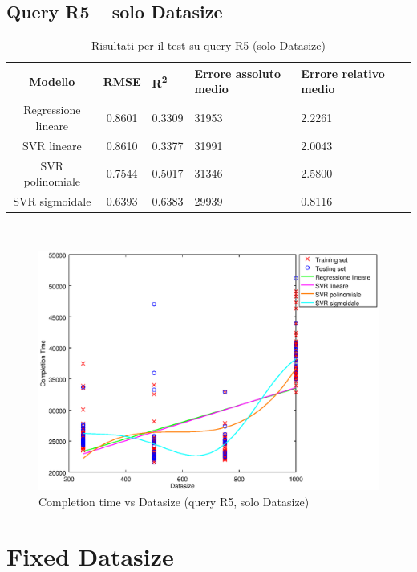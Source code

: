 \documentclass[a4paper,11pt]{article}
\begin{document}
\subsection{Query R5 -- solo Datasize}
\begin{table}[bhpt]
	\centering
	\begin{adjustbox}{center}
		\begin{tabular}{c | c M{1cm} M{2.5cm} M{2.5cm} M{1.8cm}}
			Modello & RMSE & R\textsuperscript{2} & Errore assoluto medio & Errore relativo medio \tabularnewline
			\hline
			Regressione lineare & 0.8601 & 0.3309 &  31953 & 2.2261 \\
			SVR lineare & 0.8610 & 0.3377 &  31991 & 2.0043 \\
			SVR polinomiale & 0.7544 & 0.5017 &  31346 & 2.5800 \\
			SVR sigmoidale & 0.6393 & 0.6383 &  29939 & 0.8116 \\
		\end{tabular}
	\end{adjustbox}
	\\
	\caption{Risultati per il test su query R5 (solo Datasize)}
	\label{table_R5_datasize}
\end{table}

\begin {figure}[hbtp]
\centering
\includegraphics[width=\textwidth]{output/R5_SOLO_DATASIZE/plot_R5.eps}
\caption {Completion time vs Datasize (query R5, solo Datasize)}
\end {figure}


\newpage
\section{Fixed Datasize}
\end{document}
